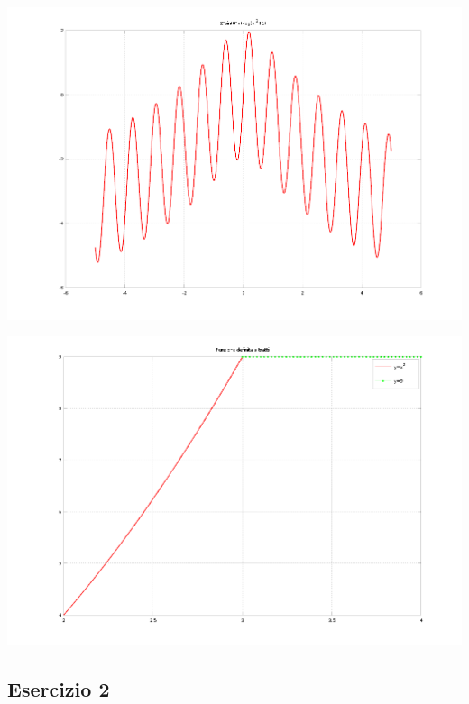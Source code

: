 \documentclass{article}
\begin{document}
\centerline{\includegraphics[scale=0.6]{ex51a.png}}
\centerline{\includegraphics[scale=0.6]{ex51b.png}}


\newpage
\subsection{ Esercizio 2}
\begin{lstlisting}

\end{lstlisting}


\newpage
\end{document}
